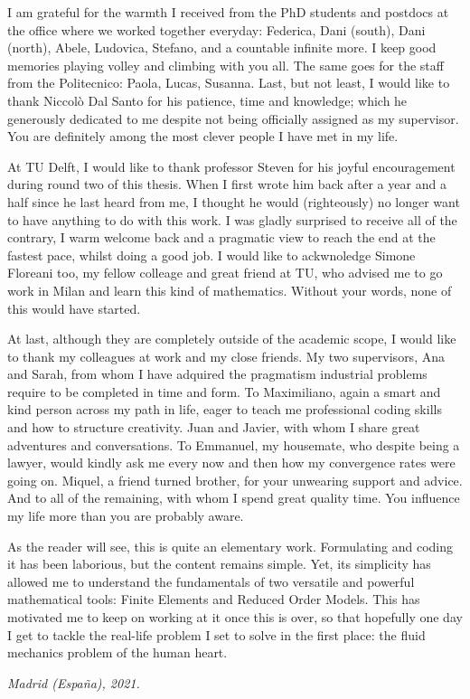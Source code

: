 \documentclass[thesis.tex]{subfiles}
\begin{document}
I am grateful for the warmth I received from the PhD students and postdocs at the office where we worked together everyday: Federica, Dani (south), Dani (north), Abele, Ludovica, Stefano, and a countable infinite more.
I keep good memories playing volley and climbing with you all.
The same goes for the staff from the Politecnico: Paola, Lucas, Susanna.
Last, but not least, I would like to thank Niccolò Dal Santo for his patience, time and knowledge; which he generously dedicated to me despite not being officially assigned as my supervisor. 
You are definitely among the most clever people I have met in my life.

At TU Delft, I would like to thank professor Steven for his joyful encouragement during round two of this thesis.
When I first wrote him back after a year and a half since he last heard from me, I thought he would (righteously) no longer want to have anything to do with this work.
I was gladly surprised to receive all of the contrary, I warm welcome back and a pragmatic view to reach the end at the fastest pace, whilst doing a good job. 
I would like to ackwnoledge Simone Floreani too, my fellow colleage and great friend at TU,
who advised me to go work in Milan and learn this kind of mathematics.
Without your words, none of this would have started.

At last, although they are completely outside of the academic scope, I would like to thank my colleagues at work and my close friends.
My two supervisors, Ana and Sarah, from whom I have adquired the pragmatism industrial problems require to be completed in time and form.
To Maximiliano, again a smart and kind person across my path in life, eager to teach me professional coding skills and how to structure creativity.
Juan and Javier, with whom I share great adventures and conversations.
To Emmanuel, my housemate, who despite being a lawyer, 
would kindly ask me every now and then how my convergence rates were going on.
Miquel, a friend turned brother, for your unwearing support and advice.
And to all of the remaining, with whom I spend great quality time.
You influence my life more than you are probably aware.

As the reader will see, this is quite an elementary work.
Formulating and coding it has been laborious, but the content remains simple.
Yet, its simplicity has allowed me to understand the fundamentals of 
two versatile and powerful mathematical tools: 
Finite Elements and Reduced Order Models.
This has motivated me to keep on working at it once this is over, 
so that hopefully one day I get to tackle the real-life problem 
I set to solve in the first place: 
the fluid mechanics problem of the human heart.

\begin{flushright}
    \vspace{5mm}
    \textit{Madrid (España), 2021.}    
\end{flushright}
\end{document}
